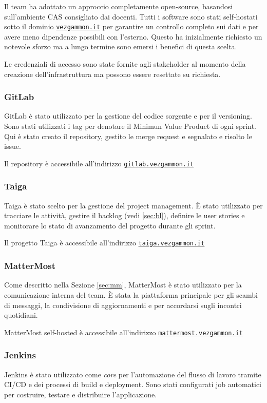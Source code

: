 \documentclass{article}
\begin{document}
Il team ha adottato un approccio completamente open-source, basandosi sull'ambiente CAS consigliato dai docenti. 
Tutti i software sono stati self-hostati sotto il dominio \href{https://vezgammon.it}{\texttt{vezgammon.it}} per garantire 
un controllo completo sui dati e per avere meno dipendenze possibili con l'esterno. Questo ha inizialmente richiesto 
un notevole sforzo ma a lungo termine sono emersi i benefici di questa scelta.

Le credenziali di accesso sono state fornite agli stakeholder al momento della creazione dell'infrastruttura ma possono 
essere resettate su richiesta.

\subsubsection{GitLab}
GitLab è stato utilizzato per la gestione del codice sorgente e per il versioning. Sono stati utilizzati i tag per denotare 
il Minimun Value Product di ogni sprint. 
Qui è stato creato il repository, gestito le merge request e segnalato e risolto le issue.

Il repository è accessibile all'indirizzo \href{https://gitlab.vezgammon.it}{\texttt{gitlab.vezgammon.it}}  

\subsubsection{Taiga}
Taiga è stato scelto per la gestione del project management. È stato utilizzato per tracciare le attività, gestire il 
backlog (vedi \ref{sec:bl}), definire le user stories e monitorare lo stato di avanzamento del progetto durante gli sprint.

Il progetto Taiga è accessibile all'indirizzo \href{https://taiga.vezgammon.it}{\texttt{taiga.vezgammon.it}}

\subsubsection{MatterMost}
Come descritto nella Sezione \ref{sec:mm}, MatterMost è stato utilizzato per la comunicazione interna del team. È stata 
la piattaforma principale per gli scambi di messaggi, la condivisione di aggiornamenti e per accordarsi sugli incontri quotidiani.

MatterMost self-hosted è accessibile all'indirizzo \href{https://mattermost.vezgammon.it}{\texttt{mattermost.vezgammon.it}}

\subsubsection{Jenkins}
Jenkins è stato utilizzato come \textit{core} per l'automazione del flusso di lavoro tramite CI/CD e dei processi di build 
e deployment. Sono stati configurati job automatici per costruire, testare e distribuire l'applicazione.
\end{document}
